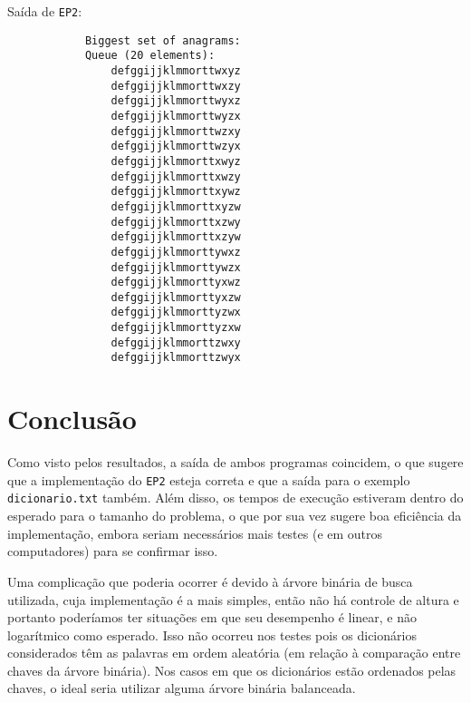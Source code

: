 \documentclass[a4paper]{article}
\newcommand{\ttt}{\texttt}
\begin{document}
        Saída de \ttt{EP2}:
        \begin{lstlisting}
            Biggest set of anagrams:
            Queue (20 elements):
                defggijjklmmorttwxyz
                defggijjklmmorttwxzy
                defggijjklmmorttwyxz
                defggijjklmmorttwyzx
                defggijjklmmorttwzxy
                defggijjklmmorttwzyx
                defggijjklmmorttxwyz
                defggijjklmmorttxwzy
                defggijjklmmorttxywz
                defggijjklmmorttxyzw
                defggijjklmmorttxzwy
                defggijjklmmorttxzyw
                defggijjklmmorttywxz
                defggijjklmmorttywzx
                defggijjklmmorttyxwz
                defggijjklmmorttyxzw
                defggijjklmmorttyzwx
                defggijjklmmorttyzxw
                defggijjklmmorttzwxy
                defggijjklmmorttzwyx

        \end{lstlisting}

\section{Conclusão}
    Como visto pelos resultados, a saída de ambos programas coincidem, o que sugere que a implementação do \ttt{EP2} esteja correta e que a saída para o exemplo \ttt{dicionario.txt} também. Além disso, os tempos de execução estiveram dentro do esperado para o tamanho do problema, o que por sua vez sugere boa eficiência da implementação, embora seriam necessários mais testes (e em outros computadores) para se confirmar isso.

    Uma complicação que poderia ocorrer é devido à árvore binária de busca utilizada, cuja implementação é a mais simples, então não há controle de altura e portanto poderíamos ter situações em que seu desempenho é linear, e não logarítmico como esperado. Isso não ocorreu nos testes pois os dicionários considerados têm as palavras em ordem aleatória (em relação à comparação entre chaves da árvore binária). Nos casos em que os dicionários estão ordenados pelas chaves, o ideal seria utilizar alguma árvore binária balanceada. 
\end{document}
